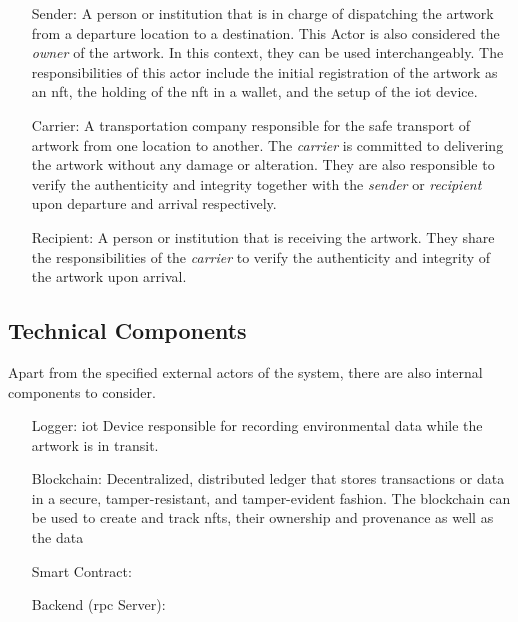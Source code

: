 \begin{itemize}[align=left, font=\itshape]
    \item[Sender:] A person or institution that is in charge of dispatching the artwork from a departure location to a destination. This Actor is also considered the \textit{owner} of the artwork. In this context, they can be used interchangeably. The responsibilities of this actor include the initial registration of the artwork as an \gls{nft}, the holding of the \gls{nft} in a \gls{wallet}, and the setup of the \gls{iot} device.

    \item[Carrier:] A transportation company responsible for the safe transport of artwork from one location to another. The \textit{carrier} is committed to delivering the artwork without any damage or alteration. They are also responsible to verify the authenticity and integrity together with the \textit{sender} or \textit{recipient} upon departure and arrival respectively.

    \item[Recipient:] A person or institution that is receiving the artwork. They share the responsibilities of the \textit{carrier} to verify the authenticity and integrity of the artwork upon arrival. 
\end{itemize}


\subsection{Technical Components}
Apart from the specified external actors of the system, there are also internal components to consider.

\begin{itemize}[align=left,font=\itshape]
    \item[Logger:] \gls{iot} Device responsible for recording environmental data while the artwork is in transit.  
    \item[Blockchain:] Decentralized, distributed ledger that stores transactions or data in a secure, tamper-resistant, and tamper-evident fashion. The blockchain can be used to create and track \glspl{nft}, their ownership and provenance as well as the data
    \item[Smart Contract:]  
    \item[Backend (\gls{rpc} Server):]
\end{itemize}

